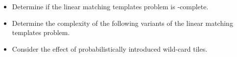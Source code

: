 \begin{itemize}
\item Determine if the linear matching templates problem is \NP-complete.
\item Determine the complexity of the following variants of the linear matching
  templates problem.
\item Consider the effect of probabilistically introduced wild-card tiles.
\end{itemize}
